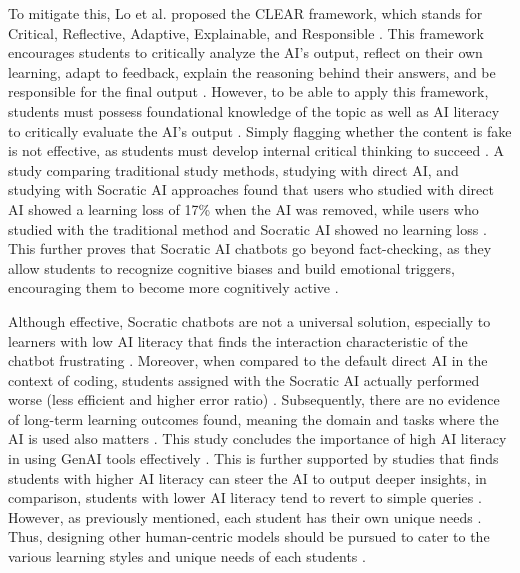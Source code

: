 \documentclass{article}
\begin{document}
To mitigate this, Lo et al. proposed the CLEAR framework, which stands for 
Critical, Reflective, Adaptive, Explainable, and Responsible \cite{Lo2023}. 
This framework encourages students to critically analyze the AI's output, 
reflect on their own learning, adapt to feedback, 
explain the reasoning behind their answers, and be responsible for the final output \cite{Lo2023}.
However, to be able to apply this framework, students must possess foundational 
knowledge of the topic as well as AI literacy to 
critically evaluate the AI's output \cite{Lo2023}. 
Simply flagging whether the content is fake is not effective, as 
students must develop internal critical thinking to succeed \cite{Duelen2024}. 
A study comparing traditional study methods, 
studying with direct AI, and studying with Socratic AI approaches 
found that users who studied with direct AI showed a learning loss of 17\% when the AI was removed, 
while users who studied with the traditional method and Socratic AI showed no learning loss \cite{Bastani2025}.
This further proves that Socratic AI chatbots go beyond fact-checking, 
as they allow students to recognize cognitive biases and build emotional triggers, 
encouraging them to become more cognitively active \cite{Duelen2024}.

Although effective, Socratic chatbots are not a universal solution, especially to 
learners with low AI literacy that finds the interaction characteristic of the chatbot frustrating \cite{Jin2025}.
Moreover, when compared to the default direct AI in the context of coding, students 
assigned with the Socratic AI actually performed worse (less efficient and higher error ratio) \cite{Liding2026}. 
Subsequently, there are no evidence of long-term learning outcomes found, 
meaning the domain and tasks where the AI is used also matters \cite{Liding2026}. 
This study concludes the importance of high AI literacy in using GenAI tools 
effectively \cite{Jin2025, KimetAl2026}. This is further supported by studies that finds 
students with higher AI literacy can steer the AI to output deeper insights, in comparison, 
students with lower AI literacy tend to revert to simple queries \cite{Jin2025,KimetAl2026}. 
However, as previously mentioned, each student has their own unique needs \cite{Jabbour2025}. 
Thus, designing other human-centric models should be pursued to cater to the various learning styles and unique needs of each students \cite{qian2025pedagogical}.
\end{document}
